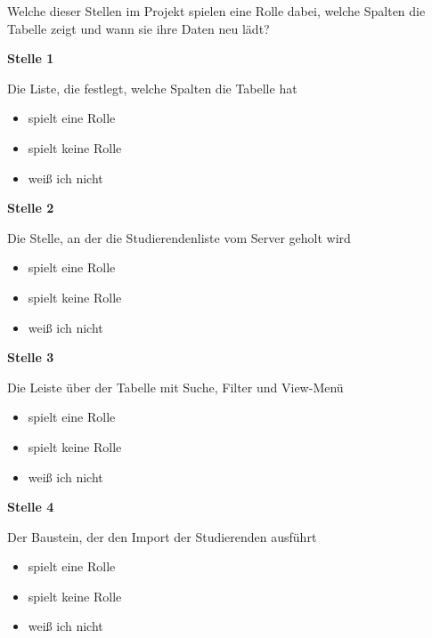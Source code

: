Welche dieser Stellen im Projekt spielen eine Rolle dabei, welche Spalten die Tabelle zeigt und wann sie ihre Daten neu lädt?

\noindent\begin{minipage}{\linewidth}
\textbf{Stelle 1}\par
Die Liste, die festlegt, welche Spalten die Tabelle hat

\begin{itemize}[nosep,leftmargin=2.4em]
\item[\kreuz] spielt eine Rolle
\item[\kreuz] spielt keine Rolle
\item[\kreuz] weiß ich nicht
\end{itemize}
\end{minipage}

\medskip

\noindent\begin{minipage}{\linewidth}
\textbf{Stelle 2}\par
Die Stelle, an der die Studierendenliste vom Server geholt wird

\begin{itemize}[nosep,leftmargin=2.4em]
\item[\kreuz] spielt eine Rolle
\item[\kreuz] spielt keine Rolle
\item[\kreuz] weiß ich nicht
\end{itemize}
\end{minipage}

\medskip

\noindent\begin{minipage}{\linewidth}
\textbf{Stelle 3}\par
Die Leiste über der Tabelle mit Suche, Filter und View-Menü

\begin{itemize}[nosep,leftmargin=2.4em]
\item[\kreuz] spielt eine Rolle
\item[\kreuz] spielt keine Rolle
\item[\kreuz] weiß ich nicht
\end{itemize}
\end{minipage}

\medskip

\noindent\begin{minipage}{\linewidth}
\textbf{Stelle 4}\par
Der Baustein, der den Import der Studierenden ausführt

\begin{itemize}[nosep,leftmargin=2.4em]
\item[\kreuz] spielt eine Rolle
\item[\kreuz] spielt keine Rolle
\item[\kreuz] weiß ich nicht
\end{itemize}
\end{minipage}

